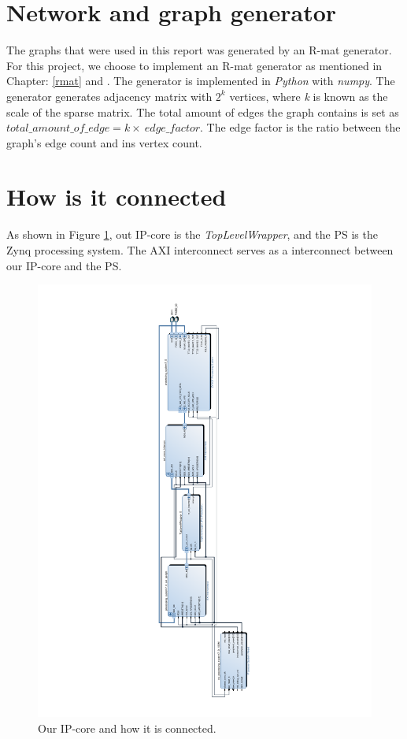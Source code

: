 \section{Network and graph generator}
The graphs that were used in this report was generated by an R-mat generator. For this project, we choose to implement an R-mat generator as mentioned in Chapter: \ref{rmat} and  \cite{Rmat2004}. The generator is implemented in \textit{Python} \cite{PYTHON} with \textit{numpy}. The generator generates adjacency matrix with $2^k$ vertices, where \textit{k} is known as the scale of the sparse matrix. The total amount of edges the graph contains is set as $total\_amount\_of\_edge = k \times\ edge\_factor $. The edge factor is the ratio between the graph's edge count and ins vertex count\cite{graph500}.



\section{How is it connected}
As shown in Figure \ref{fig:vivadoImple}, out IP-core is the \textit{TopLevelWrapper}, and the PS is the Zynq processing system. The AXI interconnect serves as a interconnect between our IP-core and the PS.

\begin{figure}[!ht]
\includegraphics[scale=0.7]{Figures/design_1}
\caption{Our IP-core and how it is connected.}
\label{fig:vivadoImple}
\end{figure}

